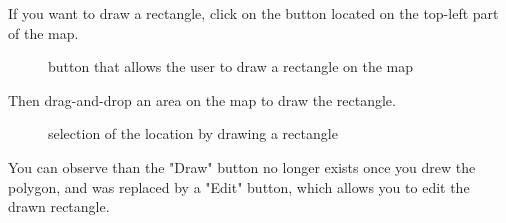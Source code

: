 \documentclass[a4paper,11pt]{report}
\begin{document}
\begin{enumerate}
\begin{itemize}
		If you want to draw a rectangle, click on the button located on the top-left part of the map.
		\begin{figure}[H]
		\vspace{-5pt}
		\begin{center}
		\vspace{-5pt}
		\caption{button that allows the user to draw a rectangle on the map}
		\end{center}
		\end{figure}
		\vspace{-10pt}	
		\newpage
		
		Then drag-and-drop an area on the map to draw the rectangle.	
		
		\begin{figure}[H]
		\vspace{-5pt}
		\begin{center}
		\vspace{-5pt}
		\caption{selection of the location by drawing a rectangle}
		\end{center}
		\end{figure}
		\vspace{-10pt}
		
		You can observe than the "Draw" button no longer exists once you drew the polygon, and was replaced by a "Edit" button, which allows you to edit the drawn rectangle.
		

\end{itemize}
\end{enumerate}
\end{document}
